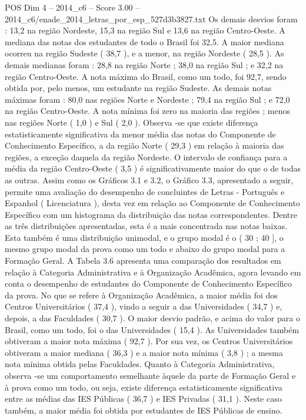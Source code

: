 \begin{textsample}{POS Dim 4 – 2014\_c6 – Score 3.00 – 2014\_c6/enade\_2014\_letras\_por\_esp\_527d3b3827.txt}
Os demais desvios foram : 13,2 na região Nordeste, 15,3 na região Sul e 13,6 na região Centro-Oeste.
A mediana das notas dos estudantes de todo o Brasil foi 32,5.
A maior mediana ocorreu na região Sudeste ( 38,7 ), e a menor, na região Nordeste ( 28,5 ).
As demais medianas foram : 28,8 na região Norte ; 38,0 na região Sul ; e 32,2 na região Centro-Oeste.
A nota máxima do Brasil, como um todo, foi 92,7, sendo obtida por, pelo menos, um estudante na região Sudeste.
As demais notas máximas foram : 80,0 nas regiões Norte e Nordeste ; 79,4 na região Sul ; e 72,0 na região Centro-Oeste.
A nota mínima foi zero na maioria das regiões ; menos nas regiões Norte ( 1,0 ) e Sul ( 2,0 ).
Observa -se que existe diferença estatisticamente significativa da menor média das notas do Componente de Conhecimento Específico, a da região Norte ( 29,3 ) em relação à maioria das regiões, a exceção daquela da região Nordeste.
O intervalo de confiança para a média da região Centro-Oeste ( 3,5 ) é significativamente maior do que o de todas as outras.
Assim como os Gráficos 3.1 e 3.2, o Gráfico 3.3, apresentado a seguir, permite uma avaliação do desempenho de concluintes de Letras - Português e Espanhol ( Licenciatura ), desta vez em relação ao Componente de Conhecimento Específico com um histograma da distribuição das notas correspondentes.
Dentre as três distribuições apresentadas, esta é a mais concentrada nas notas baixas.
Esta também é uma distribuição unimodal, e o grupo modal é o ( 30 ; 40 ], o mesmo grupo modal da prova como um todo e abaixo do grupo modal para a Formação Geral.
A Tabela 3.6 apresenta uma comparação dos resultados em relação à Categoria Administrativa e à Organização Acadêmica, agora levando em conta o desempenho de estudantes do Componente de Conhecimento Específico da prova.
No que se refere à Organização Acadêmica, a maior média foi dos Centros Universitários ( 37,4 ), vindo a seguir a das Universidades ( 34,7 ) e, depois, a das Faculdades ( 30,7 ).
O maior desvio padrão, e acima do valor para o Brasil, como um todo, foi o das Universidades ( 15,4 ).
As Universidades também obtiveram a maior nota máxima ( 92,7 ).
Por sua vez, os Centros Universitários obtiveram a maior mediana ( 36,3 ) e a maior nota mínima ( 3,8 ) ; a mesma nota mínima obtida pelas Faculdades.
Quanto à Categoria Administrativa, observa -se um comportamento semelhante àquele da parte de Formação Geral e à prova como um todo, ou seja, existe diferença estatisticamente significativa entre as médias das IES Públicas ( 36,7 ) e IES Privadas ( 31,1 ).
Neste caso também, a maior média foi obtida por estudantes de IES Públicas de ensino.

\end{textsample}
